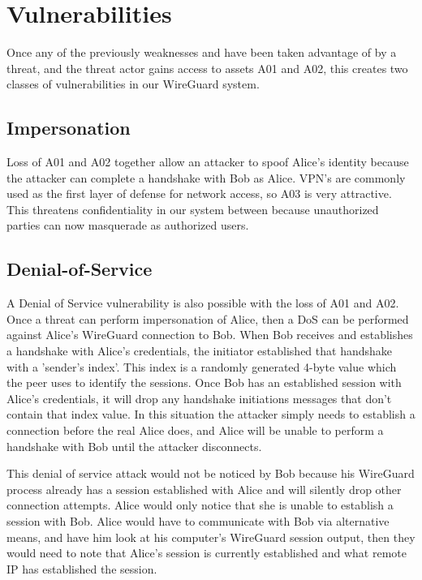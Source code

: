 \documentclass [11pt, proquest] {uwthesis}[2020/02/24]
\begin{document}
\section{Vulnerabilities}
Once any of the previously weaknesses and have been taken advantage of by a threat, and the threat actor gains access to assets A01 and A02, this creates two classes of vulnerabilities in our WireGuard system.

\subsection{Impersonation}
\label{impersonation}
Loss of A01 and A02 together allow an attacker to spoof Alice's identity because the attacker can complete a handshake with Bob as Alice. VPN's are commonly used as the first layer of defense for network access, so A03 is very attractive.
This threatens confidentiality in our system between because unauthorized parties can now masquerade as authorized users. 

\subsection{Denial-of-Service}
\label{dos}
A Denial of Service vulnerability is also possible with the loss of A01 and A02. Once a threat can perform impersonation of Alice, then a DoS can be performed against Alice's WireGuard connection to Bob. When Bob receives and establishes a handshake with Alice's credentials, the initiator established that handshake with a 'sender's index'. This index is a randomly generated 4-byte value which the peer uses to identify the sessions. Once Bob has an established session with Alice's credentials, it will drop any handshake initiations messages that don't contain that index value. In this situation the attacker simply needs to establish a connection before the real Alice does, and Alice will be unable to perform a handshake with Bob until the attacker disconnects.

This denial of service attack would not be noticed by Bob because his WireGuard process already has a session established with Alice and will silently drop other connection attempts. Alice would only notice that she is unable to establish a session with Bob. Alice would have to communicate with Bob via alternative means, and have him look at his computer's WireGuard session output, then they would need to note that Alice's session is currently established and what remote IP has established the session.
\end{document}
